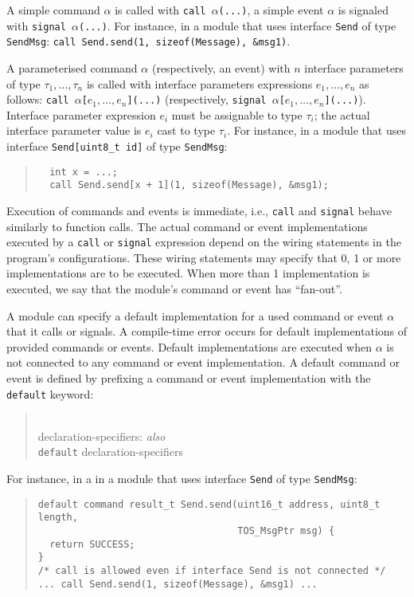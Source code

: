 \documentclass[11pt,letterpaper]{article}
\newcommand{\kw}[1]{{\tt #1}}
\newcommand{\code}[1]{{\tt #1}}
\newcommand{\grammarshift}{\vspace*{-.7cm}}
\newcommand{\grammarindent}{\hspace*{2cm}\= \\ \kill}
\begin{document}
A simple command $\alpha$ is called with \code{call $\alpha$(...)}, a
simple event $\alpha$ is signaled with \code{signal $\alpha$(...)}. For
instance, in a module that uses interface \code{Send} of type \kw{SendMsg}:
\code{call Send.send(1, sizeof(Message), \&msg1)}.

A parameterised command $\alpha$ (respectively, an event) with $n$
interface parameters of type $\tau_1, \ldots, \tau_n$ is called with
interface parameters expressions $e_1, \ldots, e_n$ as follows: \code{call
$\alpha$[$e_1, \ldots, e_n$](...)}  (respectively, \code{signal
$\alpha$[$e_1, \ldots, e_n$](...)}). Interface parameter expression $e_i$
must be assignable to type $\tau_i$; the actual interface parameter value
is $e_i$ cast to type $\tau_i$. For instance, in a module that uses
interface \code{Send[uint8\_t id]} of type \kw{SendMsg}:

\begin{quote} \begin{verbatim}
  int x = ...;
  call Send.send[x + 1](1, sizeof(Message), &msg1);
\end{verbatim} \end{quote}

Execution of commands and events is immediate, i.e., \kw{call} and
\kw{signal} behave similarly to function calls. The actual command or event
implementations executed by a \code{call} or \code{signal} expression
depend on the wiring statements in the program's configurations. These
wiring statements may specify that 0, 1 or more implementations are to be
executed. When more than 1 implementation is executed, we say that the
module's command or event has ``fan-out''.  

A module can specify a default implementation for a used command or event
$\alpha$ that it calls or signals. A compile-time error occurs for default
implementations of provided commands or events. Default implementations are
executed when $\alpha$ is not connected to any command or event
implementation. A default command or event is defined by prefixing a
command or event implementation with the \kw{default} keyword:
\begin{quote} \grammarshift \em \begin{tabbing}
\grammarindent
declaration-specifiers: \emph{also}\\
\>	\kw{default} declaration-specifiers\\
\end{tabbing} \end{quote}
For instance, in a in a module that uses interface \code{Send} of type
\kw{SendMsg}:
\begin{quote} \begin{verbatim}
default command result_t Send.send(uint16_t address, uint8_t length, 
                                   TOS_MsgPtr msg) {
  return SUCCESS;
}
/* call is allowed even if interface Send is not connected */
... call Send.send(1, sizeof(Message), &msg1) ...
\end{verbatim} \end{quote}
\end{document}

